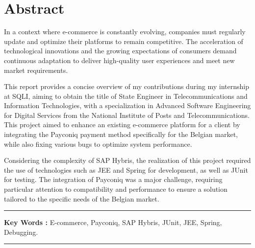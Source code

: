 \chapter*{Abstract}

In a context where e-commerce is constantly evolving, companies must regularly update and optimize their platforms to remain competitive. The acceleration of technological innovations and the growing expectations of consumers demand continuous adaptation to deliver high-quality user experiences and meet new market requirements.
\vspace{10pt}

This report provides a concise overview of my contributions during my internship at SQLI, aiming to obtain the title of State Engineer in Telecommunications and Information Technologies, with a specialization in Advanced Software Engineering for Digital Services from the National Institute of Posts and Telecommunications. This project aimed to enhance an existing e-commerce platform for a client by integrating the Payconiq payment method specifically for the Belgian market, while also fixing various bugs to optimize system performance.
\vspace{10pt}

Considering the complexity of SAP Hybris, the realization of this project required the use of technologies such as JEE and Spring for development, as well as JUnit for testing. The integration of Payconiq was a major challenge, requiring particular attention to compatibility and performance to ensure a solution tailored to the specific needs of the Belgian market.
\vspace{10pt}

\noindent\rule[2pt]{\textwidth}{0.5pt}

{\textbf{Key Words :}}
E-commerce, Payconiq, SAP Hybris, JUnit, JEE, Spring, Debugging.
\\
\noindent\rule[2pt]{\textwidth}{0.5pt}